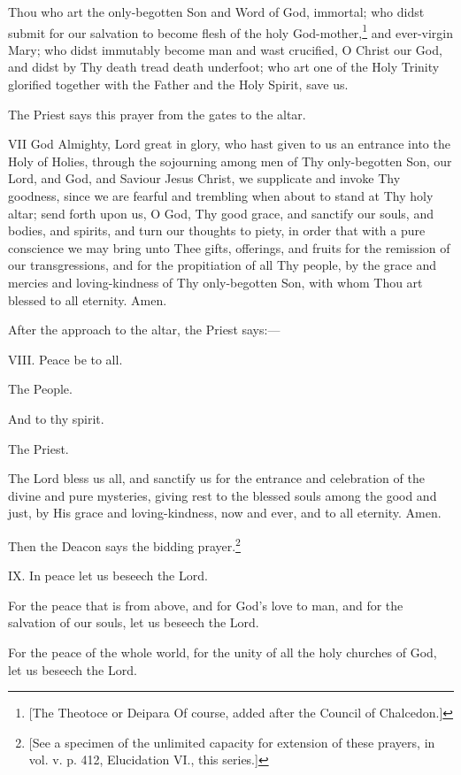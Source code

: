 Thou who art the only-begotten Son and Word of God, immortal; who didst submit for our salvation to become flesh of the holy God-mother,\footnote{\par{}  [The Theotoce or Deipara Of course, added after the Council of Chalcedon.]} and ever-virgin Mary; who didst immutably become man and wast crucified, O Christ our God, and didst by Thy death tread death underfoot; who art one of the Holy Trinity glorified together with the Father and the Holy Spirit, save us.

The Priest says this prayer from the gates to the altar.

\textsc{VII} God Almighty, Lord great in glory, who hast given to us an entrance into the Holy of Holies, through the sojourning among men of Thy only-begotten Son, our Lord, and God, and Saviour Jesus Christ, we supplicate and invoke Thy goodness, since we are fearful and trembling when about to stand at Thy holy altar; send forth upon us, O God, Thy good grace, and sanctify our souls, and bodies, and spirits, and turn our thoughts to piety, in order that with a pure conscience we may bring unto Thee gifts, offerings, and fruits for the remission of our transgressions, and for the propitiation of all Thy people, by the grace and mercies and loving-kindness of Thy only-begotten Son, with whom Thou art blessed to all eternity. Amen.

After the approach to the altar, the Priest says:—

VIII. Peace be to all.

The People.

And to thy spirit.

The Priest.

The Lord bless us all, and sanctify us for the entrance and celebration of the divine and pure mysteries, giving rest to the blessed souls among the good and just, by His grace and loving-kindness, now and ever, and to all eternity. Amen.

Then the Deacon says the bidding prayer.\footnote{\par{}  [See a specimen of the unlimited capacity for extension of these prayers, in vol. v. p. 412, Elucidation VI., this series.]}

IX. In peace let us beseech the Lord.

For the peace that is from above, and for God’s love to man, and for the salvation of our souls, let us beseech the Lord.

For the peace of the whole world, for the unity of all the holy churches of God, let us beseech the Lord.

